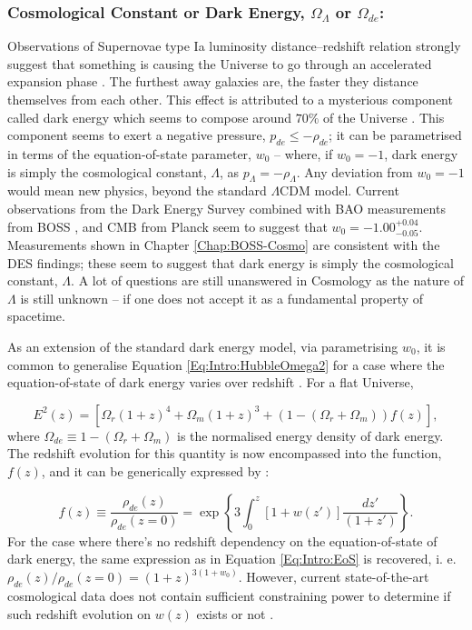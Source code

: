 \subsubsection{Cosmological Constant or Dark Energy, $\Omega_{\Lambda}$ or $\Omega_{de}$:}
Observations of Supernovae type Ia luminosity distance--redshift relation strongly suggest that something is causing the Universe to go through an accelerated expansion phase \citep{1998Riess,1999Perlmutter,2018LambdaCentury}. The furthest away galaxies are, the faster they distance themselves from each other. This effect is attributed to a mysterious component called dark energy which seems to compose around $70\%$ of the Universe \citep{2018PlanckCosmology}. This component seems to exert a negative pressure, $p_{de} \leq - \rho_{de}$; it can be parametrised in terms of the equation-of-state parameter, $w_0$ -- where, if $w_0 = -1$, dark energy is simply the cosmological constant, $\Lambda$, as $p_{\Lambda}= - \rho_{\Lambda}$. Any deviation from $w_0 = -1$ would mean new physics, beyond the standard $\Lambda$CDM model. Current observations from the Dark Energy Survey combined with BAO measurements from BOSS \citep{2016BOSSCosmology}, and CMB from Planck \citep{PlanckCosmology2016} seem to suggest that $w_0 = -1.00^{+0.04}_{-0.05}$. Measurements shown in Chapter \ref{Chap:BOSS-Cosmo} are consistent with the DES findings; these seem to suggest that dark energy is simply the cosmological constant, $\Lambda$. A lot of questions are still unanswered in Cosmology as the nature of $\Lambda$ is still unknown -- if one does not accept it as a fundamental property of spacetime.

\qquad As an extension of the standard dark energy model, via parametrising $w_0$, it is common to generalise Equation \eqref{Eq:Intro:HubbleOmega2} for a case where the equation-of-state of dark energy varies over redshift \citep{2001Chevallier,2011Shi,2014DarkEnergyReview}. For a flat Universe, 

\begin{equation}
    E^2(z) = \left[ \Omega_r (1+z)^4 + \Omega_m(1+z)^3 + (1 - (\Omega_r+\Omega_m))f(z)\right],
\end{equation}
where $\Omega_{de} \equiv 1 - (\Omega_r+\Omega_m)$ is the normalised energy density of dark energy. The redshift evolution for this quantity is now encompassed into the function, $f(z)$, and it can be generically expressed by \citep{2011Shi,2014DarkEnergyReview}: 

\begin{equation}
    f(z) \equiv \frac{\rho_{de}(z)}{\rho_{de}(z=0)} = \exp \left\{ 3 \int_0^z [1 + w(z')]\frac{dz'}{(1+z')} \right\}.
\end{equation}
For the case where there's no redshift dependency on the equation-of-state of dark energy, the same expression as in Equation \eqref{Eq:Intro:EoS} is recovered, i. e. $\rho_{de}(z)/\rho_{de}(z=0) = (1+z)^{3(1+w_0)}$. However, current state-of-the-art cosmological data does not contain sufficient constraining power to determine if such redshift evolution on $w(z)$ exists or not \citep{ 2016BOSSCosmology,2018PlanckCosmology}.


